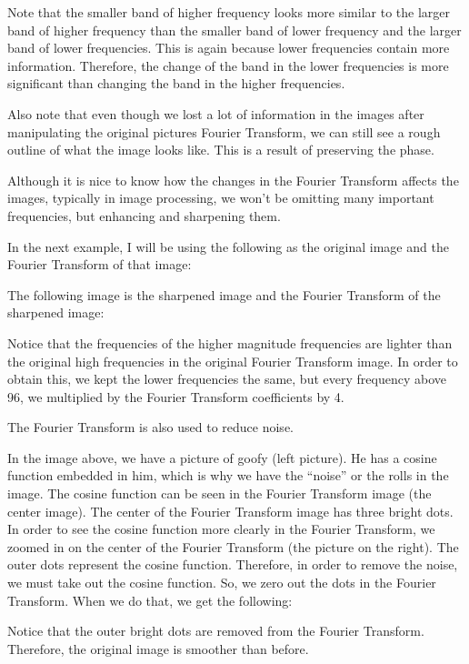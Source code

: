 \documentclass [../article.tex]{subfiles}
\begin{document}
  Note that the smaller band of higher frequency looks more similar
  to the larger band of higher frequency than the smaller band of
  lower frequency and the larger band of lower frequencies.  This is
  again because lower frequencies contain more information.
  Therefore, the change of the band in the lower frequencies is more
  significant than changing the band in the higher frequencies.

  Also note that even though we lost a lot of information in the
  images after manipulating the original pictures Fourier Transform,
  we can still see a rough outline of what the image looks like.
  This is a result of preserving the phase.

  Although it is nice to know how the changes in the Fourier
  Transform affects the images, typically in image processing, we
  won’t be omitting many important frequencies, but enhancing and
  sharpening them.

  In the next example, I will be using the following as the original
  image and the Fourier Transform of that image:

  The following image is the sharpened image and the Fourier
  Transform of the sharpened image:

  Notice that the frequencies of the higher magnitude frequencies
  are lighter than the original high frequencies in the original
  Fourier Transform image.  In order to obtain this, we kept the
  lower frequencies the same, but every frequency above 96, we
  multiplied by the Fourier Transform coefficients by 4.

  The Fourier Transform is also used to reduce noise.

  In the image above, we have a picture of goofy (left picture).  He
  has a cosine function embedded in him, which is why we have the
  “noise” or the rolls in the image. The cosine function can be seen
  in the Fourier Transform image (the center image).  The center of
  the Fourier Transform image has three bright dots.  In order to
  see the cosine function more clearly in the Fourier Transform, we
  zoomed in on the center of the Fourier Transform (the picture on
  the right).  The outer dots represent the cosine function.
  Therefore, in order to remove the noise, we must take out the
  cosine function.  So, we zero out the dots in the Fourier
  Transform.  When we do that, we get the following:

  Notice that the outer bright dots are removed from the Fourier
  Transform.  Therefore, the original image is smoother than before.
\end{document}
